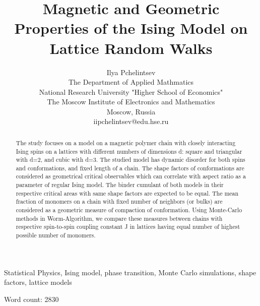 \documentclass[conference]{IEEEtran}
\title{Magnetic and Geometric Properties of the Ising Model on Lattice Random Walks}
\author{Ilya Pchelintsev\\
The Department of Applied Mathmatics\\
National Research University "Higher School of Economics"\\
The Moscow Institute of Electronics and Mathematics\\
Moscow, Russia\\
iipchelintsev@edu.hse.ru}
\begin{document}
\maketitle



\begin{abstract}
The study focuses on a model on a magnetic polymer chain with closely interacting Ising spins on a lattices with different numbers of dimensions d: square and triangular with d=2, and cubic with d=3. The studied model has dynamic disorder for both spins and conformations, and fixed length of a chain. The shape factors of conformations are considered as geometrical critical observables which can correlate with aspect ratio as a parameter of regular Ising model. The binder cumulant of both models in their respective critical areas with same shape factors are expected to be equal. The mean fraction of monomers on a chain with fixed number of neighbors (or bulks) are considered as a geometric measure of compaction of conformation. Using Monte-Carlo methods in Worm-Algorithm, we compare these measures between chains with respective spin-to-spin coupling constant J in lattices having equal number of highest possible number of monomers. 
\end{abstract}

\begin{IEEEkeywords}
Statistical Physics, Ising model, phase transition, Monte Carlo simulations, shape factors, lattice models
\end{IEEEkeywords}











\null \hfill Word count: 2830

\end{document}
